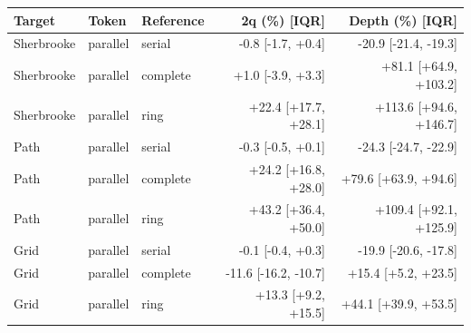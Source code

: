 \begin{tabular}{lllrr}
\toprule
Target & Token & Reference & 2q (\%) [IQR] & Depth (\%) [IQR]\\
\midrule
Sherbrooke & parallel & serial & -0.8 [-1.7, +0.4] & -20.9 [-21.4, -19.3]\\
Sherbrooke & parallel & complete & +1.0 [-3.9, +3.3] & +81.1 [+64.9, +103.2]\\
Sherbrooke & parallel & ring & +22.4 [+17.7, +28.1] & +113.6 [+94.6, +146.7]\\
Path & parallel & serial & -0.3 [-0.5, +0.1] & -24.3 [-24.7, -22.9]\\
Path & parallel & complete & +24.2 [+16.8, +28.0] & +79.6 [+63.9, +94.6]\\
Path & parallel & ring & +43.2 [+36.4, +50.0] & +109.4 [+92.1, +125.9]\\
Grid & parallel & serial & -0.1 [-0.4, +0.3] & -19.9 [-20.6, -17.8]\\
Grid & parallel & complete & -11.6 [-16.2, -10.7] & +15.4 [+5.2, +23.5]\\
Grid & parallel & ring & +13.3 [+9.2, +15.5] & +44.1 [+39.9, +53.5]\\
\bottomrule
\end{tabular}
